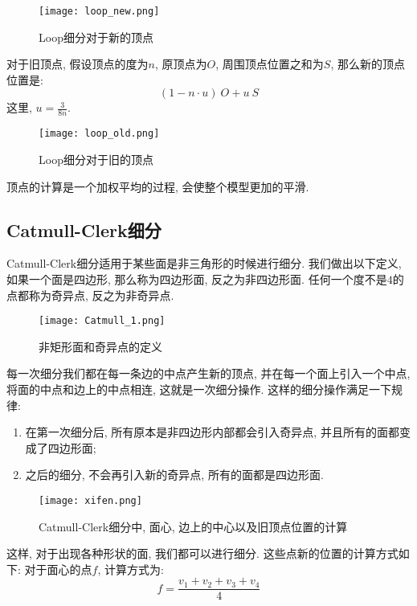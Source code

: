 \begin{figure}[H]
	\centering
	\texttt{[image: loop\_new.png]}
	\caption{Loop细分对于新的顶点}
	\label{fig:loop_new}
\end{figure}

对于旧顶点, 假设顶点的度为$n$, 原顶点为$O$, 周围顶点位置之和为$S$, 那么新的顶点位置是: 
\begin{equation}
	(1-n\cdot u)\ O+u\ S
\end{equation}
这里, $u=\frac{3}{8n}$. 

\begin{figure}[H]
	\centering
	\texttt{[image: loop\_old.png]}
	\caption{Loop细分对于旧的顶点}
	\label{fig:loop_old}
\end{figure}

顶点的计算是一个加权平均的过程, 会使整个模型更加的平滑. 

\subsection{Catmull-Clerk细分}
Catmull-Clerk细分适用于某些面是非三角形的时候进行细分. 我们做出以下定义, 如果一个面是四边形, 那么称为四边形面, 反之为非四边形面. 任何一个度不是$4$的点都称为奇异点, 反之为非奇异点. 

\begin{figure}[H]
	\centering
	\texttt{[image: Catmull\_1.png]}
	\caption{非矩形面和奇异点的定义}
	\label{fig:Catmull_1}
\end{figure}

每一次细分我们都在每一条边的中点产生新的顶点, 并在每一个面上引入一个中点, 将面的中点和边上的中点相连, 这就是一次细分操作. 这样的细分操作满足一下规律: 
\begin{enumerate}
	\item 在第一次细分后, 所有原本是非四边形内部都会引入奇异点, 并且所有的面都变成了四边形面; 
	\item 之后的细分, 不会再引入新的奇异点, 所有的面都是四边形面. 
\end{enumerate}

\begin{figure}[H]
	\centering
	\texttt{[image: xifen.png]}
	\caption{Catmull-Clerk细分中, 面心, 边上的中心以及旧顶点位置的计算}
	\label{fig:xifen}
\end{figure}

这样, 对于出现各种形状的面, 我们都可以进行细分. 这些点新的位置的计算方式如下: 
对于面心的点$f$, 计算方式为: 
\begin{equation}
	f=\frac{v_1+v_2+v_3+v_4}{4}
\end{equation}

